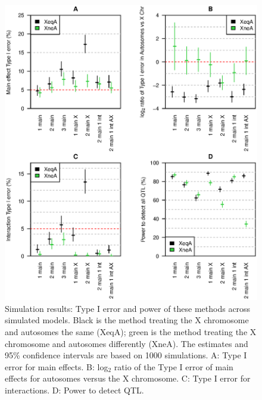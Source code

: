 \documentclass[12pt,letterpaper]{article}
\begin{document}
\clearpage
\begin{figure}
\centering
\includegraphics[width=\textwidth]{Figs/fig_sim.eps}

\vspace{0cm}

\caption{Simulation results: Type I error and power of these methods
  across simulated models. Black is the method treating the X
  chromosome and autosomes the same (XeqA); green is the method
  treating the X chromosome and autosomes differently (XneA).
  The estimates and 95\% confidence intervals are based on 1000 simulations.
  A: Type I error for main effects. B: log$_2$ ratio of the
  Type I error of main effects for autosomes versus the X
  chromosome. C: Type I error for interactions.
  D: Power to detect QTL.
\label{fig:sim_result}}
\end{figure}
\end{document}
